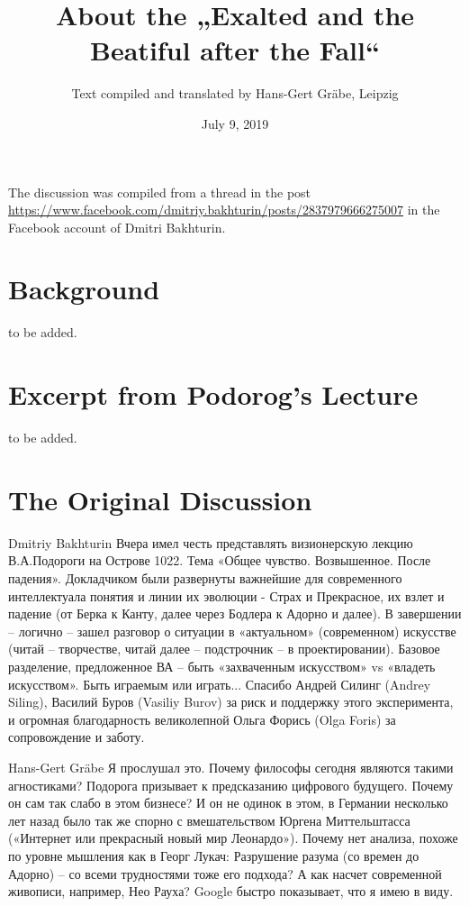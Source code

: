 \documentclass[11pt,a4paper]{article}
\title{About the „Exalted and the Beatiful after the Fall“}
\author{Text compiled and translated by Hans-Gert Gr\"abe, Leipzig}
\date{July 9, 2019}
\begin{document}
\maketitle

The discussion was compiled from a thread in the post
\url{https://www.facebook.com/dmitriy.bakhturin/posts/2837979666275007} in the
Facebook account of Dmitri Bakhturin.

\section*{Background}

to be added. 

\section*{Excerpt from Podorog's Lecture}

to be added.

\section*{The Original Discussion}
Dmitriy Bakhturin Вчера имел честь представлять визионерскую лекцию
В.А.Подороги на Острове 1022. Тема «Общее чувство. Возвышенное. После
падения».  Докладчиком были развернуты важнейшие для современного
интеллектуала понятия и линии их эволюции - Страх и Прекрасное, их взлет и
падение (от Берка к Канту, далее через Бодлера к Адорно и далее). В завершении
-- логично -- зашел разговор о ситуации в «актуальном» (современном) искусстве
(читай -- творчестве, читай далее -- подстрочник -- в проектировании). Базовое
разделение, предложенное ВА -- быть «захваченным искусством» vs «владеть
искусством». Быть играемым или играть...  Спасибо Андрей Силинг (Andrey
Siling), Василий Буров (Vasiliy Burov) за риск и поддержку этого эксперимента,
и огромная благодарность великолепной Ольга Форись (Olga Foris) за
сопровождение и заботу.

Hans-Gert Gräbe Я прослушал это. Почему философы сегодня являются такими
агностиками? Подорога призывает к предсказанию цифрового будущего. Почему он
сам так слабо в этом бизнесе? И он не одинок в этом, в Германии несколько лет
назад было так же спорно с вмешательством Юргена Миттельштасса («Интернет или
прекрасный новый мир Леонардо»). Почему нет анализа, похоже по уровне мышления
как в Георг Лукач: Разрушение разума (со времен до Адорно) -- со всеми
трудностями тоже его подхода? А как насчет современной живописи, например, Нео
Рауха? Google быстро показывает, что я имею в виду. 
\end{document}
